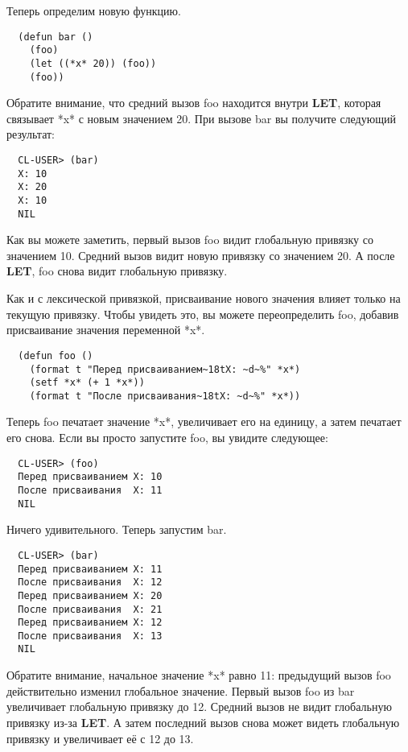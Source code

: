 Теперь определим новую функцию.

\begin{lstlisting}
  (defun bar ()
    (foo)
    (let ((*x* 20)) (foo))
    (foo))
\end{lstlisting}

Обратите внимание, что средний вызов foo находится внутри \textbf{LET}, которая связывает
*x* с новым значением 20. При вызове bar вы получите следующий результат:

\begin{verbatim}
  CL-USER> (bar)
  X: 10
  X: 20
  X: 10
  NIL
\end{verbatim}

Как вы можете заметить, первый вызов foo видит глобальную привязку со значением
10. Средний вызов видит новую привязку со значением 20. А после \textbf{LET}, foo снова
видит глобальную привязку.

Как и с лексической привязкой, присваивание нового значения влияет только на текущую
привязку. Чтобы увидеть это, вы можете переопределить foo, добавив присваивание значения
переменной *x*.

\begin{lstlisting}
  (defun foo ()
    (format t "Перед присваиванием~18tX: ~d~%" *x*)
    (setf *x* (+ 1 *x*))
    (format t "После присваивания~18tX: ~d~%" *x*))
\end{lstlisting}

Теперь foo печатает значение *x*, увеличивает его на единицу, а затем печатает его
снова. Если вы просто запустите foo, вы увидите следующее:

\begin{verbatim}
  CL-USER> (foo)
  Перед присваиванием X: 10
  После присваивания  X: 11
  NIL
\end{verbatim}

Ничего удивительного. Теперь запустим bar.

\begin{verbatim}
  CL-USER> (bar)
  Перед присваиванием X: 11
  После присваивания  X: 12
  Перед присваиванием X: 20
  После присваивания  X: 21
  Перед присваиванием X: 12
  После присваивания  X: 13
  NIL
\end{verbatim}

Обратите внимание, начальное значение *x* равно 11: предыдущий вызов foo действительно
изменил глобальное значение. Первый вызов foo из bar увеличивает глобальную привязку до
12. Средний вызов не видит глобальную привязку из-за \textbf{LET}. А затем последний вызов
снова может видеть глобальную привязку и увеличивает её с 12 до 13.

